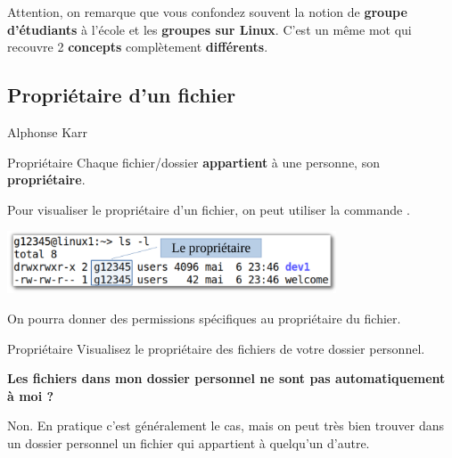 \documentclass[a4paper,11pt]{style-esi/td}
\begin{document}
		\medskip
		\begin{alertbox}
			Attention, on remarque que vous confondez souvent 
			la notion de \textbf{groupe d'étudiants} à l'école
			et les \textbf{groupes sur Linux}.
			C'est un même mot qui recouvre 2 
			\textbf{concepts} complètement \textbf{différents}.
		\end{alertbox}

	\subsection{Propriétaire d'un fichier}
	
			{Alphonse Karr}
		\vspace{2em}

		\vspace{1em}

		\begin{theorie}{Propriétaire}
			Chaque fichier/dossier \textbf{appartient} à une personne, 
			son \textbf{propriétaire}.
		\end{theorie}

		Pour visualiser le propriétaire d'un fichier, 
		on peut utiliser la commande .

		\begin{center}
			\includegraphics[height=5em]{image/owner}
		\end{center}

		On pourra donner des permissions spécifiques au propriétaire du fichier.

		\begin{Exercice}{Propriétaire}
			Visualisez le propriétaire des fichiers de votre dossier personnel.
		\end{Exercice}

		\begin{faq}
			\textbf{Les fichiers dans mon dossier personnel ne sont pas automatiquement à moi ?}

			Non. En pratique c'est généralement le cas, 
			mais on peut très bien trouver dans un dossier personnel 
			un fichier qui appartient à quelqu'un d'autre.  
		\end{faq}
\end{document}
